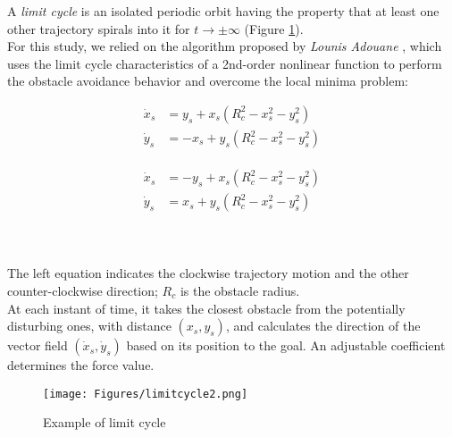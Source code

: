A \textit{limit cycle} is an isolated periodic orbit having the property that at least one other trajectory spirals into it for $t\rightarrow\pm\infty$ (Figure \ref{examplecycle}).\\
For this study, we relied on the algorithm proposed by \textit{Lounis Adouane} \cite{adouane:hal-01717955}, which uses the limit cycle characteristics of a 2nd-order nonlinear function to perform the obstacle avoidance behavior and overcome the local minima problem:\\
\begin{minipage}{.5\linewidth}
	\begin{align*}
		\dot x_s &=y_s+ x_s(R_c^2 - x_s^2 - y_s^2) \\
		\dot y_s &= -x_s + y_s(R_c^2 - x_s^2 - y_s^2)  
	\end{align*}
\end{minipage}
\begin{minipage}{.5\linewidth}
	\begin{align}
		\begin{split}
			\dot x_s &=-y_s+ x_s(R_c^2 - x_s^2 - y_s^2) \\
			\dot y_s &=x_s + y_s(R_c^2 - x_s^2 - y_s^2)  
		\end{split}
	\end{align}
\end{minipage}\\
\vspace{0.3cm}\\
The left equation indicates the clockwise trajectory motion and the other counter-clockwise direction; $R_c$ is the obstacle radius. \\
At each instant of time, it takes the closest obstacle from the potentially disturbing ones, with distance $(x_s,y_s)$,  and calculates the direction of the vector field $(\dot x_s,\dot y_s)$ based on its position to the goal. An adjustable coefficient determines the force value.
\vspace{0.5cm}
\begin{figure}[H]
	\centering
	\texttt{[image: Figures/limitcycle2.png]}
	\caption{Example of limit cycle}
	\label{examplecycle}
\end{figure} 
\newpage
